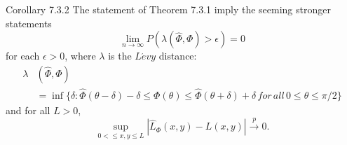 \documentclass[11pt]{beamer}
\begin{document}
\begin{frame}{Corollary 7.3.2}
The statement of Theorem 7.3.1 imply the seeming stronger statements
\begin{displaymath}
\lim_{n\to \infty} P(\lambda (\hat{\Phi},\Phi)>\epsilon)=0
\end{displaymath}
for each $\epsilon>0$, where $\lambda$ is the $L\acute{e}vy$ distance:
\begin{displaymath}
\begin{split}
\lambda &(\hat{\Phi},\Phi)\\ 
              &=\inf \{\delta:\hat{\Phi}(\theta-\delta)-\delta \le \Phi(\theta)\le \hat{\Phi}(\theta+\delta)+\delta \, for \, all\, 0\le \theta \le \pi/2 \}
\end{split}
\end{displaymath}
and for all $L>0$, 
\begin{displaymath}
\sup_{0<\le x,y\le L } |\hat{L}_{\Phi}(x,y)-L(x,y)|\stackrel{p}{\to}0.
\end{displaymath}


\end{frame}
\end{document}
